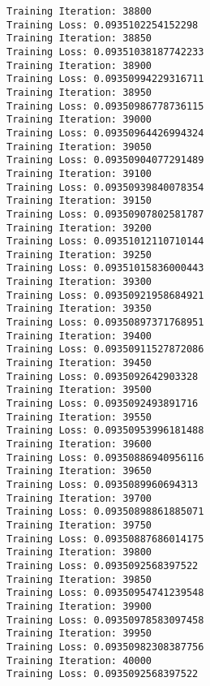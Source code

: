 \documentclass[11pt]{article}
\begin{document}
\begin{Verbatim}[commandchars=\\\{\}]
Training Iteration: 38800
Training Loss: 0.0935102254152298
Training Iteration: 38850
Training Loss: 0.09351038187742233
Training Iteration: 38900
Training Loss: 0.09350994229316711
Training Iteration: 38950
Training Loss: 0.09350986778736115
Training Iteration: 39000
Training Loss: 0.09350964426994324
Training Iteration: 39050
Training Loss: 0.09350904077291489
Training Iteration: 39100
Training Loss: 0.09350939840078354
Training Iteration: 39150
Training Loss: 0.09350907802581787
Training Iteration: 39200
Training Loss: 0.09351012110710144
Training Iteration: 39250
Training Loss: 0.09351015836000443
Training Iteration: 39300
Training Loss: 0.09350921958684921
Training Iteration: 39350
Training Loss: 0.09350897371768951
Training Iteration: 39400
Training Loss: 0.09350911527872086
Training Iteration: 39450
Training Loss: 0.0935092642903328
Training Iteration: 39500
Training Loss: 0.0935092493891716
Training Iteration: 39550
Training Loss: 0.09350953996181488
Training Iteration: 39600
Training Loss: 0.09350886940956116
Training Iteration: 39650
Training Loss: 0.0935089960694313
Training Iteration: 39700
Training Loss: 0.09350898861885071
Training Iteration: 39750
Training Loss: 0.09350887686014175
Training Iteration: 39800
Training Loss: 0.0935092568397522
Training Iteration: 39850
Training Loss: 0.09350954741239548
Training Iteration: 39900
Training Loss: 0.09350978583097458
Training Iteration: 39950
Training Loss: 0.09350982308387756
Training Iteration: 40000
Training Loss: 0.0935092568397522

    \end{Verbatim}
\end{document}
